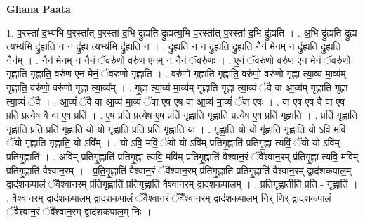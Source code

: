\documentclass[17pt]{extarticle}
\begin{document}
\textbf{Ghana Paata } \newline

1. प॒रस्ता॑ द॒भ्य॑भि प॒रस्ता᳚त् प॒रस्ता॑ द॒भि द्रु॑ह्यति द्रुह्यत्य॒भि प॒रस्ता᳚त् प॒रस्ता॑ द॒भि द्रु॑ह्यति । . अ॒भि द्रु॑ह्यति द्रुह्य त्य॒भ्य॑भि द्रु॑ह्यति॒ न न द्रु॑ह्य त्य॒भ्य॑भि द्रु॑ह्यति॒ न । . द्रु॒ह्य॒ति॒ न न द्रु॑ह्यति द्रुह्यति॒ नैन॑ मेन॒म् न द्रु॑ह्यति द्रुह्यति॒ नैन᳚म् । . नैन॑ मेन॒म् न नैनं॒ ॅवरु॑णो॒ वरु॑ण एन॒म् न नैनं॒ ॅवरु॑णः । . ए॒नं॒ ॅवरु॑णो॒ वरु॑ण एन मेनं॒ ॅवरु॑णो गृह्णाति गृह्णाति॒ वरु॑ण एन मेनं॒ ॅवरु॑णो गृह्णाति । . वरु॑णो गृह्णाति गृह्णाति॒ वरु॑णो॒ वरु॑णो गृह्णा त्या॒व्य॑ मा॒व्य॑म् गृह्णाति॒ वरु॑णो॒ वरु॑णो गृह्णा त्या॒व्य᳚म् । . गृ॒ह्णा॒ त्या॒व्य॑ मा॒व्य॑म् गृह्णाति गृह्णा त्या॒व्यं॑ ॅवै वा आ॒व्य॑म् गृह्णाति गृह्णा त्या॒व्यं॑ ॅवै । . आ॒व्यं॑ ॅवै वा आ॒व्य॑ मा॒व्यं॑ ॅवा ए॒ष ए॒ष वा आ॒व्य॑ मा॒व्यं॑ ॅवा ए॒षः । . वा ए॒ष ए॒ष वै वा ए॒ष प्रति॒ प्रत्ये॒ष वै वा ए॒ष प्रति॑ । . ए॒ष प्रति॒ प्रत्ये॒ष ए॒ष प्रति॑ गृह्णाति गृह्णाति॒ प्रत्ये॒ष ए॒ष प्रति॑ गृह्णाति । . प्रति॑ गृह्णाति गृह्णाति॒ प्रति॒ प्रति॑ गृह्णाति॒ यो यो गृ॑ह्णाति॒ प्रति॒ प्रति॑ गृह्णाति॒ यः । . गृ॒ह्णा॒ति॒ यो यो गृ॑ह्णाति गृह्णाति॒ यो ऽवि॒ मविं॒ ॅयो गृ॑ह्णाति गृह्णाति॒ यो ऽवि᳚म् । . यो ऽवि॒ मविं॒ ॅयो यो ऽवि॑म् प्रतिगृ॒ह्णाति॑ प्रतिगृ॒ह्णा त्यविं॒ ॅयो यो ऽवि॑म् प्रतिगृ॒ह्णाति॑ । . अवि॑म् प्रतिगृ॒ह्णाति॑ प्रतिगृ॒ह्णा त्यवि॒ मवि॑म् प्रतिगृ॒ह्णाति॑ वैश्वान॒रं ॅवै᳚श्वान॒रम् प्र॑तिगृ॒ह्णा त्यवि॒ मवि॑म् प्रतिगृ॒ह्णाति॑ वैश्वान॒रम् । . प्र॒ति॒गृ॒ह्णाति॑ वैश्वान॒रं ॅवै᳚श्वान॒रम् प्र॑तिगृ॒ह्णाति॑ प्रतिगृ॒ह्णाति॑ वैश्वान॒रम् द्वाद॑शकपाल॒म् द्वाद॑शकपालं ॅवैश्वान॒रम् प्र॑तिगृ॒ह्णाति॑ प्रतिगृ॒ह्णाति॑ वैश्वान॒रम् द्वाद॑शकपालम् । . प्र॒ति॒गृ॒ह्णातीति॑ प्रति - गृ॒ह्णाति॑ । . वै॒श्वा॒न॒रम् द्वाद॑शकपाल॒म् द्वाद॑शकपालं ॅवैश्वान॒रं ॅवै᳚श्वान॒रम् द्वाद॑शकपाल॒म् निर् णिर् द्वाद॑शकपालं ॅवैश्वान॒रं ॅवै᳚श्वान॒रम् द्वाद॑शकपाल॒म् निः । \newline
\end{document}
